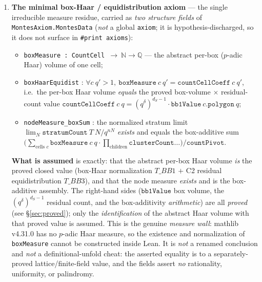 \documentclass[11pt]{article}
\theoremstyle{definition}
\theoremstyle{remark}
\begin{document}
\begin{enumerate}[label=\textup{(A\arabic*)},leftmargin=*]
\item\textbf{The minimal box-Haar / equidistribution axiom} --- the single
irreducible measure residue, carried as \emph{two structure fields} of
\texttt{MontesAxiom.MontesData} (\emph{not} a global \texttt{axiom}; it is
hypothesis-discharged, so it does not surface in \texttt{\#print axioms}):
\begin{itemize}[nosep]
\item \texttt{boxMeasure : CountCell $\to\ \mathbb N\to\mathbb Q$} --- the abstract
per-box ($p$-adic Haar) volume of one cell;
\item \texttt{boxHaarEquidist} : $\forall c\ q'>1,\
\texttt{boxMeasure}\ c\ q' = \texttt{countCellCoeff}\ c\ q'$, i.e.\ the per-box Haar
volume \emph{equals} the proved box-volume $\times$ residual-count value
$\texttt{countCellCoeff}\ c\ q = (q^{\delta})^{d_S-1}\cdot\texttt{bb1Value}\ c.\texttt{polygon}\ q$;
\item \texttt{nodeMeasure\_boxSum} : the normalized stratum limit
$\lim_N \texttt{stratumCount}\ T\ N / q^{nN}$ \emph{exists} and equals the
box-additive sum $\bigl(\sum_{\text{cells }c}\texttt{boxMeasure}\ c\ q\cdot
\prod_{\text{children}}\texttt{clusterCount}\dots\bigr)/\texttt{countPivot}$.
\end{itemize}
\textbf{What is assumed} is exactly: that the abstract per-box Haar volume \emph{is}
the proved closed value (box-Haar normalization $T\_BB1$ $+$ C2 residual
equidistribution $T\_BB3$), and that the node measure \emph{exists} and is the
box-additive assembly. The right-hand sides ($\texttt{bb1Value}$ box volume, the
$(q^{\delta})^{d_S-1}$ residual count, and the box-additivity \emph{arithmetic}) are
all \emph{proved} (see \S\ref{sec:proved}); only the \emph{identification} of the
abstract Haar volume with that proved value is assumed. This is the genuine
\emph{measure wall}: mathlib v4.31.0 has no $p$-adic Haar measure, so the existence
and normalization of \texttt{boxMeasure} cannot be constructed inside Lean. It is
\emph{not} a renamed conclusion and \emph{not} a definitional-unfold cheat: the
asserted equality is to a separately-proved lattice/finite-field value, and the
fields assert \emph{no} rationality, uniformity, or palindromy.


\end{enumerate}
\end{document}
